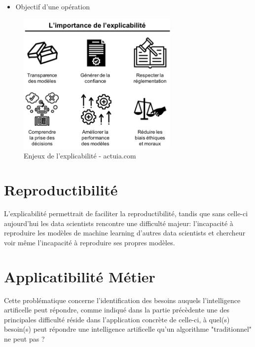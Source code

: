             \begin{itemize}
                \item Objectif d'une opération
            \end{itemize}

            
            \begin{figure}[H]
                \centering
                \includegraphics[width=0.7\textwidth]{Images/explicabilite}
                \caption{Enjeux de l'explicabilité - actuia.com}
                \label{fig:explicability}
            \end{figure}



        \section{Reproductibilité}
        L'explicabilité permettrait de faciliter la reproductibilité, tandis que sans celle-ci 
        aujourd'hui les data scientists rencontre une difficulté majeur: 
        l'incapacité à reproduire les modèles de machine learning d'autres data scientists 
        et chercheur voir même l'incapacité à reproduire ses propres modèles. \newline 
            



        \section{Applicatibilité Métier}
            Cette problématique concerne l'identification des besoins auquels l'intelligence artificelle 
            peut répondre, comme indiqué dans la partie précèdente une des principales difficulté réside 
            dans l'application concrète de celle-ci, à quel(s) besoin(s) peut répondre une 
            intelligence artificelle qu'un algorithme "traditionnel" ne peut pas ? 



